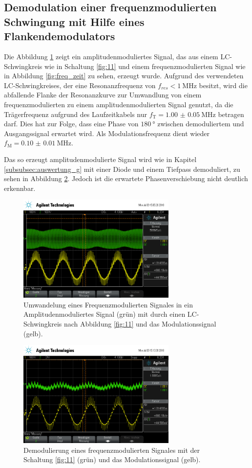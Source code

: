 \subsection{Demodulation einer frequenzmodulierten Schwingung
mit Hilfe eines Flankendemodulators}
\label{subsec:auswertung_h}
Die Abbildung \ref{fig:freq_zu_amp}
zeigt ein amplitudenmoduliertes Signal, das aus einem LC-Schwingkreis
wie in Schaltung \ref{fig:11} und einem frequenzmodulierten Signal wie in Abbildung
\ref{fig:freq_zeit} zu sehen, erzeugt wurde.
Aufgrund des verwendeten LC-Schwingkreises, der eine Resonanzfrequenz von $f_{res}< \SI{1}{\mega\hertz}$ besitzt,
wird die abfallende Flanke der Resonanzkurve zur Umwandlung von einem
frequenzmodulierten zu einem amplitudenmodulierten Signal genutzt,
da die Trägerfrequenz
aufgrund des Laufzeitkabels nur $f_{\text{T}}=\SI{1.00(5)}{\mega\hertz}$ betragen darf.
Dies hat zur Folge, dass eine Phase von $\SI{180}{\degree}$ zwischen demoduliertem und Ausgangssignal
erwartet wird.
Als Modulationsfrequenz dient wieder $f_{\text{M}}=\SI{0.10(1)}{\mega\hertz}$.

Das so erzeugt amplitudenmodulierte Signal wird wie in Kapitel \ref{subsubsec:auswertung_g}
mit einer Diode und einem Tiefpass demoduliert, zu sehen in Abbildung \ref{fig:demod_frequenz}.
Jedoch ist die erwartete Phasenverschiebung nicht deutlich erkennbar.


\begin{figure}
  \centering
  \includegraphics[width=0.7\textwidth]{osci/freq_demod_amp.png}
  \caption{Umwandelung eines Frequenzmodulierten Signales in ein Amplitudenmoduliertes
Signal (grün) mit durch einen LC-Schwingkreis nach Abbildung \ref{fig:11}  und das Modulationssignal (gelb).}
\label{fig:freq_zu_amp}
\end{figure}



\begin{figure}
  \centering
  \includegraphics[width=0.7\textwidth]{osci/freq_demod.png}
  \caption{Demodulierung eines frequenzmodulierten Signales
  mit der Schaltung \ref{fig:11} (grün)  und das Modulationssignal (gelb).}
\label{fig:demod_frequenz}
\end{figure}
